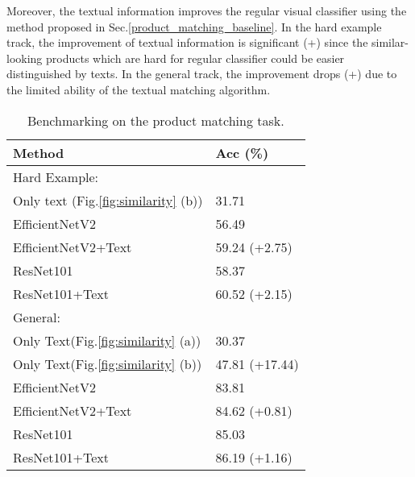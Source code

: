\documentclass[runningheads]{llncs}
\begin{document}
Moreover, the textual information improves the regular visual classifier using the method proposed in Sec.\ref{product_matching_baseline}. In the hard example track, the improvement of textual information is significant (+) since the similar-looking products which are hard for regular classifier could be easier distinguished by texts. In the general track, the improvement drops (+) due to the limited ability of the textual matching algorithm. 

\begin{table}[t]
    \begin{minipage}{0.48\columnwidth}
    \centering
    \caption{Benchmarking on the product matching task. }
    \begin{tabular}{l|l}
        \hline \hline
        Method                                       & Acc (\%)  \\ \hline
        Hard Example:                                         \\ 
        Only text (Fig.\ref{fig:similarity} (b))    & 31.71             \\
        EfficientNetV2  \cite{efficientnetv2}                         & 56.49  \\
        EfficientNetV2+Text                         & 59.24 (+2.75)   \\
        ResNet101      \cite{ResNet,pan2018IBNNet}                            & 58.37      \\
        ResNet101+Text                             & 60.52 (+2.15)      \\
        General:  \\
        Only Text(Fig.\ref{fig:similarity} (a))     & 30.37           \\
        Only Text(Fig.\ref{fig:similarity} (b))     & 47.81 (+17.44)           \\
        EfficientNetV2                      & 83.81         \\
        EfficientNetV2+Text                         & 84.62 (+0.81) \\
        ResNet101                          & 85.03              \\
        ResNet101+Text                             & 86.19 (+1.16)      \\
        \hline
    \end{tabular}
    
    \label{tab:match_hard_example}
    \end{minipage}
    \hfill
    \begin{minipage}{0.48\columnwidth}
    \centering
    

\end{minipage}
\end{table}
\end{document}
